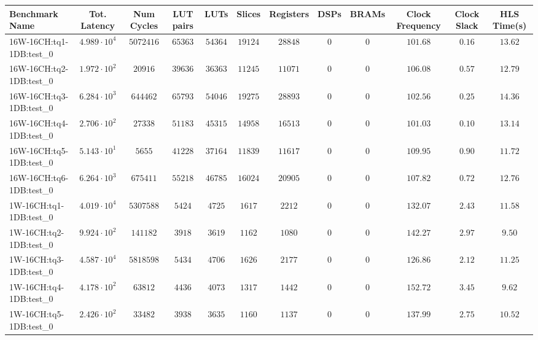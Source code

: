 \begin{tabular}{|l|c|c|c|c|c|c|c|c|c|c|c|}
\hline
Benchmark Name          & Tot. Latency           & Num Cycles    & LUT pairs   & LUTs       & Slices     & Registers  & DSPs  & BRAMs & Clock Frequency & Clock Slack & HLS Time(s) \\
\hline
16W-16CH:tq1-1DB:test\_0 & $ 4.989 \cdot 10^{4} $ & $ 5072416   $ & $ 65363   $ & $ 54364  $ & $ 19124  $ & $ 28848  $ & $ 0 $ & $ 0 $ & $ 101.68      $ & $ 0.16    $ & $ 13.62   $ \\
16W-16CH:tq2-1DB:test\_0 & $ 1.972 \cdot 10^{2} $ & $ 20916     $ & $ 39636   $ & $ 36363  $ & $ 11245  $ & $ 11071  $ & $ 0 $ & $ 0 $ & $ 106.08      $ & $ 0.57    $ & $ 12.79   $ \\
16W-16CH:tq3-1DB:test\_0 & $ 6.284 \cdot 10^{3} $ & $ 644462    $ & $ 65793   $ & $ 54046  $ & $ 19275  $ & $ 28893  $ & $ 0 $ & $ 0 $ & $ 102.56      $ & $ 0.25    $ & $ 14.36   $ \\
16W-16CH:tq4-1DB:test\_0 & $ 2.706 \cdot 10^{2} $ & $ 27338     $ & $ 51183   $ & $ 45315  $ & $ 14958  $ & $ 16513  $ & $ 0 $ & $ 0 $ & $ 101.03      $ & $ 0.10    $ & $ 13.14   $ \\
16W-16CH:tq5-1DB:test\_0 & $ 5.143 \cdot 10^{1} $ & $ 5655      $ & $ 41228   $ & $ 37164  $ & $ 11839  $ & $ 11617  $ & $ 0 $ & $ 0 $ & $ 109.95      $ & $ 0.90    $ & $ 11.72   $ \\
16W-16CH:tq6-1DB:test\_0 & $ 6.264 \cdot 10^{3} $ & $ 675411    $ & $ 55218   $ & $ 46785  $ & $ 16024  $ & $ 20905  $ & $ 0 $ & $ 0 $ & $ 107.82      $ & $ 0.72    $ & $ 12.76   $ \\
1W-16CH:tq1-1DB:test\_0  & $ 4.019 \cdot 10^{4} $ & $ 5307588   $ & $ 5424    $ & $ 4725   $ & $ 1617   $ & $ 2212   $ & $ 0 $ & $ 0 $ & $ 132.07      $ & $ 2.43    $ & $ 11.58   $ \\
1W-16CH:tq2-1DB:test\_0  & $ 9.924 \cdot 10^{2} $ & $ 141182    $ & $ 3918    $ & $ 3619   $ & $ 1162   $ & $ 1080   $ & $ 0 $ & $ 0 $ & $ 142.27      $ & $ 2.97    $ & $ 9.50    $ \\
1W-16CH:tq3-1DB:test\_0  & $ 4.587 \cdot 10^{4} $ & $ 5818598   $ & $ 5434    $ & $ 4706   $ & $ 1626   $ & $ 2177   $ & $ 0 $ & $ 0 $ & $ 126.86      $ & $ 2.12    $ & $ 11.25   $ \\
1W-16CH:tq4-1DB:test\_0  & $ 4.178 \cdot 10^{2} $ & $ 63812     $ & $ 4436    $ & $ 4073   $ & $ 1317   $ & $ 1442   $ & $ 0 $ & $ 0 $ & $ 152.72      $ & $ 3.45    $ & $ 9.62    $ \\
1W-16CH:tq5-1DB:test\_0  & $ 2.426 \cdot 10^{2} $ & $ 33482     $ & $ 3938    $ & $ 3635   $ & $ 1160   $ & $ 1137   $ & $ 0 $ & $ 0 $ & $ 137.99      $ & $ 2.75    $ & $ 10.52   $ \\

\end{tabular}
